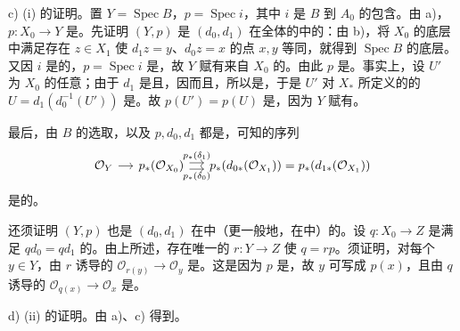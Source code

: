 c) (i) 的证明。置 $Y=\operatorname{Spec}B$，$p=\operatorname{Spec}i$，其中 $i$ 是 $B$ 到 $A_0$ 的包含。由 a)， $p:X_0\to Y$ 是。先证明 $(Y,p)$ 是 $(d_0,d_1)$ 在全体的中的：由 b)，将 $X_0$ 的底层中满足存在 $z\in X_1$ 使 $d_1z=y$、$d_0z=x$ 的点 $x,y$ 等同，就得到 $\operatorname{Spec}B$ 的底层。又因 $i$ 是的，$p=\operatorname{Spec}i$ 是，故 $Y$ 赋有来自 $X_0$ 的。由此 $p$ 是。事实上，设 $U'$ 为 $X_0$ 的任意；由于 $d_1$ 是且，因而且，所以是，于是 $U'$ 对 $X_*$ 所定义的的 $U=d_1(d_0^{-1}(U'))$ 是。故 $p(U')=p(U)$ 是，因为 $Y$ 赋有。

最后，由 $B$ 的选取，以及 $p,d_0,d_1$ 都是，可知的序列
\[
\begin{tikzcd}[column sep=small]
\mathcal O_Y\arrow[r]&p_*(\mathcal O_{X_0})\arrow[r,shift left=.6ex,"p_*(\delta_1)"]\arrow[r,shift right=.6ex,"p_*(\delta_0)"']&p_*(d_{0*}(\mathcal O_{X_1}))=p_*(d_{1*}(\mathcal O_{X_1}))
\end{tikzcd}
\]
是的。

还须证明 $(Y,p)$ 也是 $(d_0,d_1)$ 在中（更一般地，在中）的。设 $q:X_0\to Z$ 是满足 $qd_0=qd_1$ 的。由上所述，存在唯一的 $r:Y\to Z$ 使 $q=rp$。须证明，对每个 $y\in Y$，由 $r$ 诱导的 $\mathcal O_{r(y)}\to\mathcal O_y$ 是。这是因为 $p$ 是，故 $y$ 可写成 $p(x)$，且由 $q$ 诱导的 $\mathcal O_{q(x)}\to\mathcal O_x$ 是。

d) (ii) 的证明。由 a)、c) 得到。

